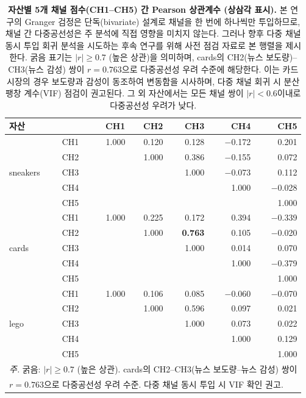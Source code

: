\documentclass[11pt, a4paper, twocolumn]{article}
\begin{document}
\begin{table}[!tbp]
\centering\small
\caption[자산별 채널 간 Pearson 상관행렬]{\textbf{자산별 5개 채널
점수(CH1--CH5) 간 Pearson 상관계수 (상삼각 표시).} 본 연구의 Granger
검정은 단독(bivariate) 설계로 채널을 한 번에 하나씩만 투입하므로,
채널 간 다중공선성은 주 분석에 직접 영향을 미치지 않는다. 그러나
향후 다중 채널 동시 투입 회귀 분석을 시도하는 후속 연구를 위해
사전 점검 자료로 본 행렬을 제시한다. 굵음 표기는 $|r| \geq 0.7$
(높은 상관)을 의미하며, cards의 CH2(뉴스 보도량)--CH3(뉴스 감성)
쌍이 $r=0.763$으로 다중공선성 우려 수준에 해당한다. 이는 카드 시장의
경우 보도량과 감성이 동조하여 변동함을 시사하며, 다중 채널 회귀
시 분산 팽창 계수(VIF) 점검이 권고된다. 그 외 자산에서는 모든 채널
쌍이 $|r|<0.6$이내로 다중공선성 우려가 낮다.}
\label{tab:corr}
\begin{tabular}{llrrrrr}
\toprule
자산 & & CH1 & CH2 & CH3 & CH4 & CH5 \\
\midrule
\multirow{5}{*}{sneakers}
 & CH1 &  1.000 &  0.120 &  0.128 & $-$0.172 &  0.201 \\
 & CH2 &        &  1.000 &  0.386 & $-$0.155 &  0.072 \\
 & CH3 &        &        &  1.000 & $-$0.073 &  0.112 \\
 & CH4 &        &        &        &     1.000 & $-$0.028 \\
 & CH5 &        &        &        &           &  1.000 \\
\midrule
\multirow{5}{*}{cards}
 & CH1 &  1.000 &  0.225 &  0.172 &  0.394 & $-$0.339 \\
 & CH2 &        &  1.000 & \textbf{0.763} &  0.105 & $-$0.020 \\
 & CH3 &        &        &  1.000 &  0.014 &  0.070 \\
 & CH4 &        &        &        &  1.000 & $-$0.379 \\
 & CH5 &        &        &        &        &   1.000 \\
\midrule
\multirow{5}{*}{lego}
 & CH1 &  1.000 &  0.106 &  0.085 & $-$0.060 & $-$0.070 \\
 & CH2 &        &  1.000 &  0.596 &  0.097 &  0.021 \\
 & CH3 &        &        &  1.000 &  0.073 &  0.022 \\
 & CH4 &        &        &        &  1.000 &  0.129 \\
 & CH5 &        &        &        &        &  1.000 \\
\bottomrule
\multicolumn{7}{l}{\textit{주.} 굵음: $|r| \geq 0.7$ (높은 상관). cards의 CH2--CH3(뉴스 보도량--뉴스 감성) 쌍이}\\
\multicolumn{7}{l}{\hspace{1em}$r=0.763$으로 다중공선성 우려 수준. 다중 채널 동시 투입 시 VIF 확인 권고.}\\
\end{tabular}
\end{table}
\end{document}
